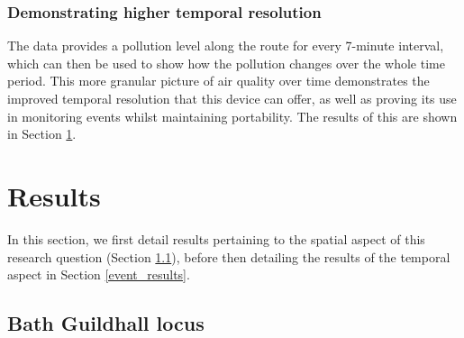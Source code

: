 \documentclass[11pt]{report}
\begin{document}
\subsubsection{Demonstrating higher temporal resolution}

The data provides a pollution level along the route for every 7-minute interval, which can then be used to show how the pollution changes over the whole time period. This more granular picture of air quality over time demonstrates the improved temporal resolution that this device can offer, as well as proving its use in monitoring events whilst maintaining portability. The results of this are shown in Section \ref{results:q2}.

\section{Results} \label{results:q2}

In this section, we first detail results pertaining to the spatial aspect of this research question (Section \ref{locus_results}), before then detailing the results of the temporal aspect in Section \ref{event_results}.

\subsection{Bath Guildhall locus} \label{locus_results}
\end{document}
